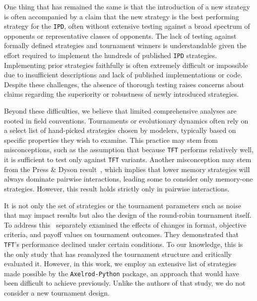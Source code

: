 \documentclass{article}
\def\axelrod{\texttt{Axelrod-Python}}
\def\TFT{\texttt{TFT}}
\def\IPD{\texttt{IPD}}
\begin{document}
One thing that has remained the same is that the introduction of a new strategy
is often accompanied by a claim that the new strategy is the best performing
strategy for the \IPD, often without extensive testing against a broad spectrum
of opponents or representative classes of opponents. The lack of testing against
formally defined strategies and tournament winners is understandable given the
effort required to implement the hundreds of published \IPD{} strategies.
Implementing prior strategies faithfully is often extremely difficult or
impossible due to insufficient descriptions and lack of published
implementations or code. Despite these challenges, the absence of thorough
testing raises concerns about claims regarding the superiority or robustness of
newly introduced strategies.

Beyond these difficulties, we believe that limited comprehensive analyses are
rooted in field conventions. Tournaments or evolutionary dynamics often rely on
a select list of hand-picked strategies chosen by modelers, typically based on
specific properties they wish to examine. This practice may stem from
misconceptions, such as the assumption that because \TFT{} performs
relatively well, it is sufficient to test only against \TFT{} variants.
Another misconception may stem from the Press \& Dyson result~\cite{Press2012},
which implies that lower memory strategies will always dominate pairwise
interactions, leading some to consider only memory-one strategies. However, this
result holds strictly only in pairwise interactions.

It is not only the set of strategies or the tournament parameters such as noise
that may impact results but also the design of the round-robin tournament itself. To
address this~\cite{Rapoport2015} separately examined the effects of changes in format, objective
criteria, and payoff values on tournament outcomes. They demonstrated that
\TFT's performance declined under certain conditions. To our knowledge,
this is the only study that has reanalyzed the tournament structure and
critically evaluated it. However, in this work, we employ an extensive list of
strategies made possible by the \axelrod{} package, an approach that would
have been difficult to achieve previously. Unlike the authors of that study, we
do not consider a new tournament design.
\end{document}
